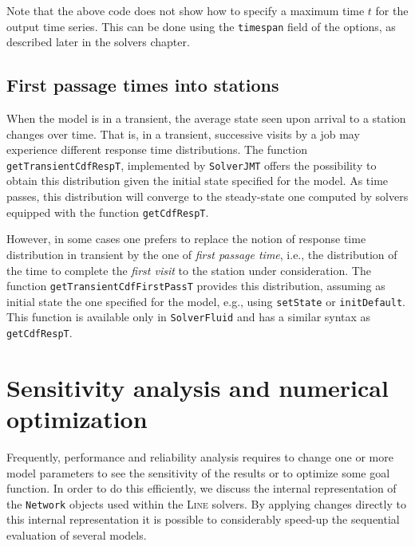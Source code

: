 Note that the above code does not show how to specify a maximum time $t$ for the output time series. This can be done using the \texttt{timespan} field of the options, as described later in the solvers chapter. %

\subsection{First passage times into stations}
When the model is in a transient, the average state seen upon arrival to a station changes over time. That is, in a transient, successive visits by a job may experience different response time distributions. The function \texttt{getTransientCdfRespT}, implemented by \texttt{SolverJMT} offers the possibility to obtain this distribution given the initial state specified for the model. As time passes, this distribution will converge to the steady-state one computed by solvers equipped with the function \texttt{getCdfRespT}.

However, in some cases one prefers to replace the notion of response time distribution in transient by the one of \emph{first passage time}, i.e., the distribution of the time to complete the {\em first visit} to the station under consideration. The function \texttt{getTransientCdfFirstPassT} provides this distribution, assuming as initial state the one specified for the model, e.g., using \texttt{setState} or \texttt{initDefault}. This function is available only in \texttt{SolverFluid} and has a similar syntax as \texttt{getCdfRespT}.

\section{Sensitivity analysis and numerical optimization}
\label{sensitivity-analysis-and-numerical-optimization}
Frequently, performance and reliability analysis requires to change one or more model parameters to see the sensitivity of the results or to optimize some goal function. In order to do this efficiently, we discuss the internal representation of the \texttt{Network} objects used within the \textsc{Line} solvers. By applying changes directly to this internal representation it is possible to considerably speed-up the sequential evaluation of several models.

